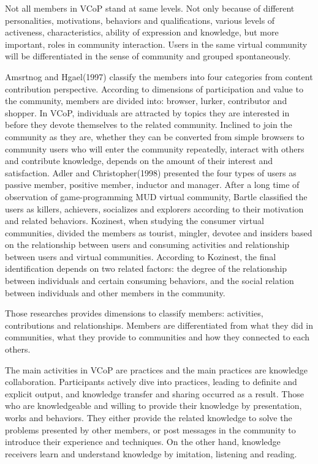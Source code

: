 \documentclass{elsarticle}
\begin{document}
Not all members in VCoP stand at same levels. Not only because of  different personalities, motivations,
behaviors and qualifications, various levels of activeness,
characteristics, ability of expression and knowledge, but more important, roles in
community interaction. Users in the same virtual community will be
differentiated in the sense of community and grouped spontaneously. 

Amsrtnog and Hgael(1997) classify the members into four categories from
content contribution perspective.  According to dimensions of participation and value to
the community, members are divided  into:  browser, lurker, contributor and shopper\cite{hagel1997net}. In VCoP, individuals are attracted
by topics they are interested in before they devote themselves to the
related community. Inclined to join the community as they are, whether
they can be converted from simple browsers to community users who will
enter the community repeatedly, interact with others and contribute
knowledge, depends on the amount of their interest and
satisfaction. Adler and Christopher(1998) presented the four types of
users as passive member, positive member, inductor and
manager\cite{Christopher1998}. After a long time of observation of
game-programming MUD virtual community, Bartle classified the users as killers, achievers, socializes and explorers according to their motivation and related behaviors\cite{mud}. Kozinest, when studying the consumer virtual communities, divided the members as tourist, mingler, devotee and insiders based on the relationship between users and consuming activities and relationship between users and virtual communities\cite{Kozinets1999252}. According to Kozinest, the final identification depends on two related factors: the degree of the relationship between individuals and certain consuming behaviors, and the social relation between individuals and other members in the community. 


Those researches provides dimensions to classify members: activities,
contributions and relationships. Members are differentiated from what
they did in communities, what they provide to communities and how they connected to
each others.

The main activities in VCoP are practices and the main practices are
knowledge collaboration.  Participants actively dive into
practices, leading to definite and explicit output, and knowledge transfer and sharing occurred 
 as a result.  Those who are knowledgeable and willing to
  provide their knowledge by presentation, works and behaviors. They
  either provide the related knowledge to solve the problems presented
  by other members, or post messages in the community to introduce
  their experience and techniques. On the other hand, knowledge receivers learn
  and understand knowledge by imitation, listening and
  reading.  
\end{document}
